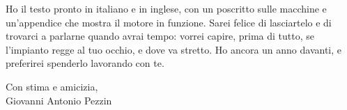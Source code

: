 \documentclass[11pt,a4paper]{article}
\begin{document}
Ho il testo pronto in italiano e in inglese, con un poscritto sulle macchine e
un'appendice che mostra il motore in funzione. Sarei felice di lasciartelo e di
trovarci a parlarne quando avrai tempo: vorrei capire, prima di tutto, se l'impianto
regge al tuo occhio, e dove va stretto. Ho ancora un anno davanti, e preferirei
spenderlo lavorando con te.

\vspace{1em}
\noindent Con stima e amicizia, \\
Giovanni Antonio Pezzin
\end{document}
